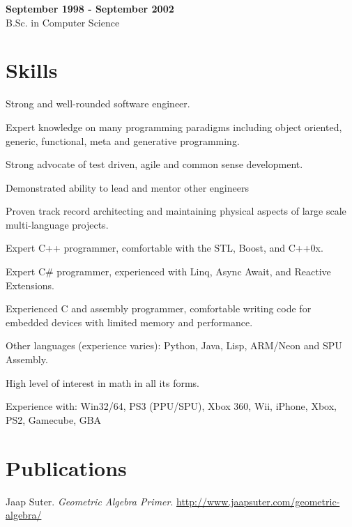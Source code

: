 \documentclass[margin, line, 11pt]{resume}
\newenvironment{list2}{
	\begin{list}{\small{\ding{110}}}{%
      \setlength{\itemsep}{0in}
      \setlength{\parsep}{0in} \setlength{\parskip}{0in}
      \setlength{\topsep}{0in} \setlength{\partopsep}{0in}
      \setlength{\leftmargin}{0.2in}}}{\end{list}}
\begin{document}
\begin{resume}
\vspace{-.3cm}
\hfill {\bf September 1998 - September 2002}\\
B.Sc. in Computer Science

\section{\sc Skills}
\begin{list2}
\item Strong and well-rounded software engineer.
\item Expert knowledge on many programming paradigms including object oriented, generic, functional, meta and generative programming.
\item Strong advocate of test driven, agile and common sense development.
\item Demonstrated ability to lead and mentor other engineers
\item Proven track record architecting and maintaining physical aspects of large scale multi-language projects.
\item Expert C++ programmer, comfortable with the STL, Boost, and C++0x.
\item Expert C\# programmer, experienced with Linq, Async Await, and Reactive Extensions.
\item Experienced C and assembly programmer, comfortable writing code for embedded devices with limited memory and performance.
\item Other languages (experience varies): Python, Java, Lisp, ARM/Neon and SPU Assembly.
\item High level of interest in math in all its forms.
\item Experience with: Win32/64, PS3 (PPU/SPU), Xbox 360, Wii, iPhone, Xbox, PS2, Gamecube, GBA
\end{list2}

\section{\sc Publications}
\vspace{.5cm}
Jaap Suter. \textsl{Geometric Algebra Primer}. \url{http://www.jaapsuter.com/geometric-algebra/}
	

\end{resume}
\end{document}
